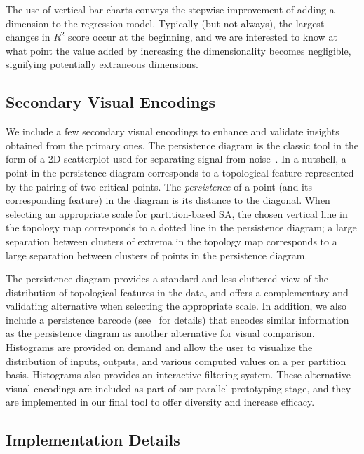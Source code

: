 The use of vertical bar charts conveys the stepwise improvement of adding a dimension to the regression model.
%
Typically (but not always), the largest changes in $R^2$ score occur at the beginning, and we are interested to know at what point the value added by increasing the dimensionality becomes negligible, signifying potentially extraneous dimensions.

\subsection{Secondary Visual Encodings}
\label{sec:otherViews}
We include a few secondary visual encodings to enhance and validate insights obtained from the primary ones.
%
The persistence diagram is the classic tool in the form of a 2D scatterplot used for separating signal from noise~\cite{EdelsbrunnerHarer2008}.
%
In a nutshell, a point in the persistence diagram corresponds to a topological feature represented by the pairing of two critical points.
%
The \emph{persistence} of a point (and its corresponding feature) in the diagram is  its distance to the diagonal.
%
When selecting an appropriate scale for partition-based SA, the chosen vertical line in the topology map corresponds to a dotted line in the persistence diagram; a large separation between clusters of extrema in the topology map corresponds to a large separation between clusters of points in the persistence diagram.

The persistence diagram provides a standard and less cluttered view of the distribution of topological features in the data, and offers a complementary and validating alternative when selecting the appropriate scale.
%
In addition, we also include a persistence
barcode (see~\cite{CarlssonZomorodianCollins2004} for details) that encodes similar information as the persistence diagram as another alternative for visual comparison.
%
Histograms are provided on demand and allow the user to visualize the distribution of inputs, outputs, and various computed values on a per partition basis.
%
Histograms also provides an interactive filtering system.
%
These alternative visual encodings are included as part of our parallel prototyping stage, and they are implemented in our final tool to offer diversity and increase efficacy.

\subsection{Implementation Details}

